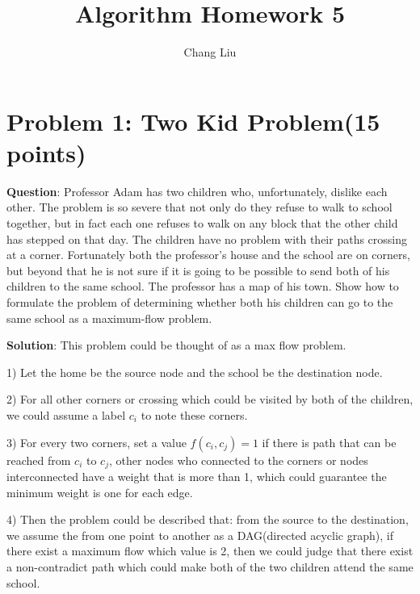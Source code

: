 \documentclass{article}
\title{Algorithm Homework 5}
\author{Chang Liu}
\begin{document}
\pagestyle{main}

\section{Problem 1: Two Kid Problem(15 points)}
\textbf{Question}: Professor Adam has two children who, unfortunately, dislike each other. The problem is so severe that not only do they refuse to walk to school together, but in fact each one refuses to walk on any block that the other child has stepped on that day. The children have no problem with their paths crossing at a corner. Fortunately both the professor’s house and the school are on corners, but beyond that he is not sure if it is going to be possible to send both of his children to the same school. The professor has a map of his town. Show how to formulate the problem of determining whether both his children can go to the same school as a maximum-flow problem.\newline


\textbf{Solution}: This problem could be thought of as a max flow problem.

1) Let the home be the source node and the school be the destination node.

2) For all other corners or crossing which could be visited by both of the children, we could assume a label $c_{i}$
to note these corners.

3) For every two corners, set a value $f(c_{i}, c_{j}) = 1$ if there is path that can be reached from $c_{i}$ to $c_{j}$, other nodes who connected to the corners or nodes interconnected have a weight that is more than 1, which could guarantee the minimum weight is one for each edge.

4) Then the problem could be described that: from the source to the destination, we assume the from one point to another
as a DAG(directed acyclic graph), if there exist a maximum flow which value is 2, then we could judge that there exist a
non-contradict path which could make both of the two children attend the same school.\newline
\end{document}

